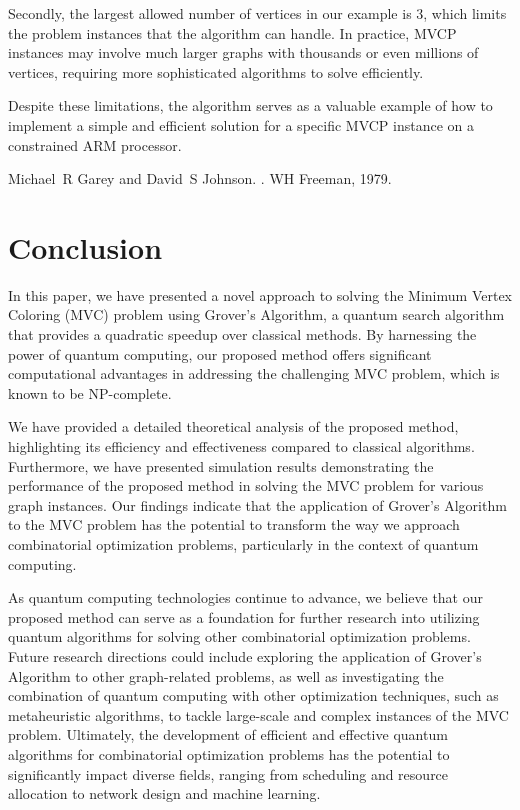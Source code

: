 Secondly, the largest allowed number of vertices in our example is 3, which limits the problem instances that the algorithm can handle. In practice, MVCP instances may involve much larger graphs with thousands or even millions of vertices, requiring more sophisticated algorithms to solve efficiently.

Despite these limitations, the algorithm serves as a valuable example of how to implement a simple and efficient solution for a specific MVCP instance on a constrained ARM processor.

\begin{thebibliography}{9}

Michael~R Garey and David~S Johnson.
.
\newblock WH Freeman, 1979.

\end{thebibliography}

\section{Conclusion}
\label{sec:conclusion}

In this paper, we have presented a novel approach to solving the Minimum Vertex Coloring (MVC) problem using Grover's Algorithm, a quantum search algorithm that provides a quadratic speedup over classical methods. By harnessing the power of quantum computing, our proposed method offers significant computational advantages in addressing the challenging MVC problem, which is known to be NP-complete.

We have provided a detailed theoretical analysis of the proposed method, highlighting its efficiency and effectiveness compared to classical algorithms. Furthermore, we have presented simulation results demonstrating the performance of the proposed method in solving the MVC problem for various graph instances. Our findings indicate that the application of Grover's Algorithm to the MVC problem has the potential to transform the way we approach combinatorial optimization problems, particularly in the context of quantum computing.

As quantum computing technologies continue to advance, we believe that our proposed method can serve as a foundation for further research into utilizing quantum algorithms for solving other combinatorial optimization problems. Future research directions could include exploring the application of Grover's Algorithm to other graph-related problems, as well as investigating the combination of quantum computing with other optimization techniques, such as metaheuristic algorithms, to tackle large-scale and complex instances of the MVC problem. Ultimately, the development of efficient and effective quantum algorithms for combinatorial optimization problems has the potential to significantly impact diverse fields, ranging from scheduling and resource allocation to network design and machine learning.

